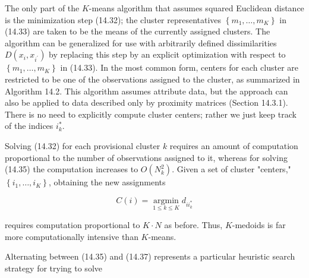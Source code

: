 \documentclass[10pt]{article}
\begin{document}
The only part of the $K$-means algorithm that assumes squared Euclidean distance is the minimization step (14.32); the cluster representatives $\left\{m_{1}, \ldots, m_{K}\right\}$ in (14.33) are taken to be the means of the currently assigned clusters. The algorithm can be generalized for use with arbitrarily defined dissimilarities $D\left(x_{i}, x_{i^{\prime}}\right)$ by replacing this step by an explicit optimization with respect to $\left\{m_{1}, \ldots, m_{K}\right\}$ in (14.33). In the most common form, centers for each cluster are restricted to be one of the observations assigned to the cluster, as summarized in Algorithm 14.2. This algorithm assumes attribute data, but the approach can also be applied to data described only by proximity matrices (Section 14.3.1). There is no need to explicitly compute cluster centers; rather we just keep track of the indices $i_{k}^{*}$.

Solving (14.32) for each provisional cluster $k$ requires an amount of computation proportional to the number of observations assigned to it, whereas for solving (14.35) the computation increases to $O\left(N_{k}^{2}\right)$. Given a set of cluster "centers," $\left\{i_{1}, \ldots, i_{K}\right\}$, obtaining the new assignments


\begin{equation*}
C(i)=\underset{1 \leq k \leq K}{\operatorname{argmin}} d_{i i_{k}^{*}} \tag{14.37}
\end{equation*}


requires computation proportional to $K \cdot N$ as before. Thus, $K$-medoids is far more computationally intensive than $K$-means.

Alternating between (14.35) and (14.37) represents a particular heuristic search strategy for trying to solve
\end{document}
